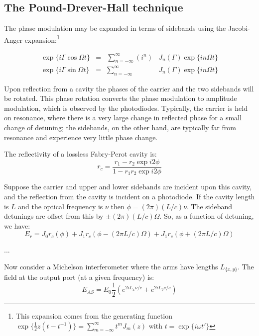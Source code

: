\subsection{The Pound-Drever-Hall technique}

The phase modulation may be expanded in terms of sidebands using the
Jacobi-Anger expansion:\footnote{This expansion comes from the 
generating function 
$\exp\{\frac{1}{2} z \left(t - t^{-1}\right)\} = \sum_{m=-\infty}^\infty t^m J_m(z)$ with $t = \exp \{i \omega t'\}$}

\begin{equation}
\begin{array}{rcll}
\exp\{i\Gamma\cos\Omega t\} & = &\sum_{n=-\infty}^{\infty} \left(i^n\right) & J_n(\Gamma) \exp\{i n \Omega t\} \\
\exp\{i\Gamma\sin\Omega t\} & = & \sum_{n=-\infty}^{\infty} & J_n(\Gamma) \exp\{i n \Omega t\}
\end{array}
\end{equation}

Upon reflection from a cavity the phases of the carrier and the two
sidebands will be rotated.  This phase rotation converts the phase
modulation to amplitude modulation, which is observed by the
photodiodes.  Typically, the carrier is held on resonance, where there
is a very large change in reflected phase for a small change of
detuning; the sidebands, on the other hand, are typically far from
resonance and experience very little phase change.

The reflectivity of a lossless Fabry-Perot cavity is:
\begin{equation}
r_c = \frac{r_1 - r_2 \exp i2\phi}{1 - r_1 r_2 \exp i 2\phi}
\end{equation}

Suppose the carrier and upper and lower sidebands are incident upon this
cavity, and the reflection from the cavity is incident on a photodiode.
If the cavity length is $L$ and the optical frequency is $\nu$ then
$\phi = (2\pi)(L/c)\nu$.  The sideband detunings are offset from this by
$\pm(2\pi)(L/c)\Omega$.  So, as a function of detuning, we have:
%
\begin{equation}
E_r = J_0 r_c(\phi) 
+ J_1 r_c(\phi - (2\pi L/c)\Omega) 
+ J_1 r_c(\phi + (2\pi L/c)\Omega)
\end{equation}

...

Now consider a Michelson interferometer where the arms have lengths
$L_{\{x,y\}}$.  The field at the output port (at a given frequency) is:
%
\begin{equation}
E_{AS} = E_0 \frac{1}{2} \left( e^{2 i L_{x} \nu /c} + e^{2 i L_{y} \nu / c} \right) 
\end{equation}

